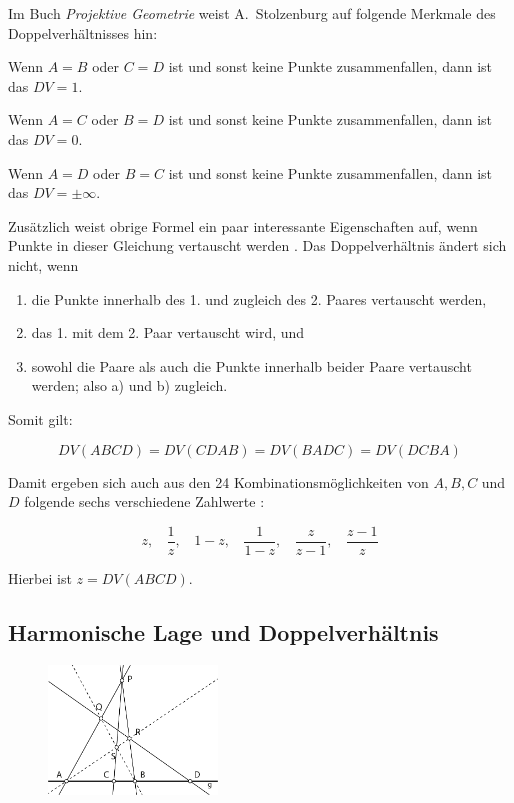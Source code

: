 \documentclass[12pt,a4paper]{article}
\begin{document}
Im Buch \textit{Projektive Geometrie} weist A.~Stolzenburg \citep{projektiveGeometrie} auf folgende Merkmale des Doppelverhältnisses hin:

Wenn $A = B$ oder $C = D$ ist und sonst keine Punkte zusammenfallen, dann ist das $DV = 1$.

Wenn $A = C$ oder $B = D$ ist und sonst keine Punkte zusammenfallen, dann ist das $DV = 0$.

Wenn $A = D$ oder $B = C$ ist und sonst keine Punkte zusammenfallen, dann ist das $DV = \pm\infty$.

Zusätzlich weist obrige Formel ein paar interessante Eigenschaften auf, wenn Punkte in dieser Gleichung vertauscht werden \citep[vgl.][S.~77]{projektiveGeometrie}. Das Doppelverhältnis ändert sich nicht, wenn

\begin{enumerate}[label={\alph*)}] 
\item die Punkte innerhalb des 1. und zugleich des 2. Paares vertauscht werden,
\item das 1. mit dem 2. Paar vertauscht wird, und
\item sowohl die Paare als auch die Punkte innerhalb beider Paare vertauscht werden; also a) und b) zugleich.
\end{enumerate}

Somit gilt:

\[DV(A B C D) = DV(C D A B) = DV(B A D C) = DV(D C B A)\]

Damit ergeben sich auch aus den 24 Kombinationsmöglichkeiten von $A, B, C$ und $D$ folgende sechs verschiedene Zahlwerte \citep[s.][S.~77f]{projektiveGeometrie}:

\[z, ~~~~\dfrac{1}{z}, ~~~~1-z, ~~~~\dfrac{1}{1-z}, ~~~~\dfrac{z}{z-1}, ~~~~\dfrac{z-1}{z}\]

Hierbei ist $z = DV(A B C D)$.

\subsection{Harmonische Lage und Doppelverhältnis}

\begin{figure}
\includegraphics[width=0.4\textwidth]{Bilder/herleitung3.png}
\end{figure}
\end{document}
